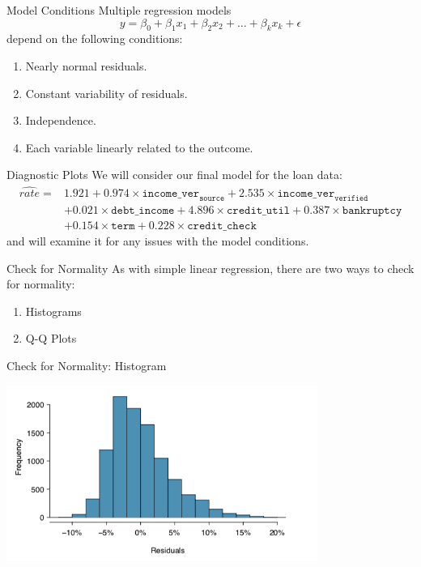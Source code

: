 \begin{frame}{Model Conditions}
    Multiple regression models 
    \[
        y = \beta_0 + \beta_1x_1 + \beta_2x_2 + \dots + \beta_kx_k + \epsilon
    \]
    depend on the following conditions:
    \begin{enumerate}
        \item Nearly normal residuals.
        \item Constant variability of residuals.
        \item Independence.
        \item Each variable linearly related to the outcome.
    \end{enumerate}
\end{frame}

\begin{frame}{Diagnostic Plots}
    We will consider our final model for the loan data:
    \small{
    \begin{align*}
        \hat{rate} =& 1.921 + 0.974\times\texttt{income\_ver}_{\texttt{source}} + 2.535\times\texttt{income\_ver}_{\texttt{verified}} \\
        &+ 0.021\times\texttt{debt\_income} + 4.896\times\texttt{credit\_util} + 0.387\times\texttt{bankruptcy} \\
        &+ 0.154\times\texttt{term} + 0.228\times\texttt{credit\_check}
    \end{align*}
    }
    and will examine it for any issues with the model conditions.   
\end{frame}

\begin{frame}{Check for Normality}
    As with simple linear regression, there are two ways to check for normality:
    \begin{enumerate}
        \item Histograms
        \item Q-Q Plots
    \end{enumerate}
\end{frame}

\begin{frame}{Check for Normality: Histogram}
    \begin{center}
        \includegraphics[width=4in]{images/multreghist.png}
    \end{center}
\end{frame}

